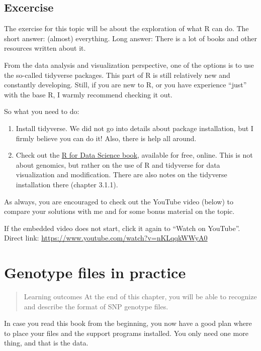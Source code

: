 \documentclass[]{book}
\begin{document}
\section{Excercise}\label{excercise}

The exercise for this topic will be about the exploration of what R can
do. The short answer: (almost) everything. Long answer: There is a lot
of books and other resources written about it.

From the data analysis and visualization perspective, one of the options
is to use the so-called tidyverse packages. This part of R is still
relatively new and constantly developing. Still, if you are new to R, or
you have experience ``just'' with the base R, I warmly recommend
checking it out.

So what you need to do:

\begin{enumerate}
\def\labelenumi{\arabic{enumi})}
\item
  Install tidyverse. We did not go into details about package
  installation, but I firmly believe you can do it! Also, there is help
  all around.
\item
  Check out the \href{https://r4ds.had.co.nz/}{R for Data Science book},
  available for free, online. This is not about genomics, but rather on
  the use of R and tidyverse for data visualization and modification.
  There are also notes on the tidyverse installation there (chapter
  3.1.1).
\end{enumerate}

As always, you are encouraged to check out the YouTube video (below) to
compare your solutions with me and for some bonus material on the topic.

If the embedded video does not start, click it again to ``Watch on
YouTube''. Direct link:
\url{https://www.youtube.com/watch?v=nKLqqkWWyA0}

\hypertarget{genotype-files-in-practice}{\chapter{Genotype files in
practice}\label{genotype-files-in-practice}}

\begin{quote}
Learning outcomes At the end of this chapter, you will be able to
recognize and describe the format of SNP genotype files.
\end{quote}

In case you read this book from the beginning, you now have a good plan
where to place your files and the support programs installed. You only
need one more thing, and that is the data.
\end{document}
